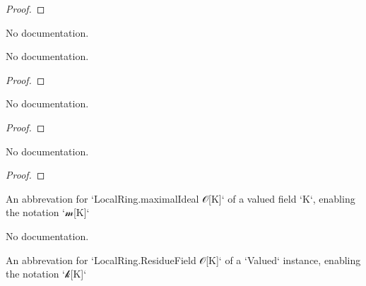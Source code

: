 \begin{proof}
    \leanok
\end{proof}

\begin{theorem}\label{Valued.integerAlgebraMap.monotone}
                No documentation.
    \end{theorem}

\begin{theorem}\label{Valued.integer_val_coe}
        \leanok
                No documentation.
    \end{theorem}

\begin{proof}
    \leanok
\end{proof}

\begin{theorem}\label{Valued.valuationSubring_val_coe}
        \leanok
                No documentation.
    \end{theorem}

\begin{proof}
    \leanok
\end{proof}

\begin{theorem}\label{Valued.integer_val_le_one}
        \leanok
                No documentation.
    \end{theorem}

\begin{proof}
    \leanok
\end{proof}

\begin{definition}\label{Valued.maximalIdeal}
        \leanok
                An abbrevation for `LocalRing.maximalIdeal 𝒪[K]` of a valued field `K`, enabling the notation `𝓂[K]`
    \end{definition}

\begin{theorem}\label{Valued.maximalIdeal_eq}
                No documentation.
    \end{theorem}

\begin{definition}\label{Valued.ResidueField}
        \leanok
                An abbrevation for `LocalRing.ResidueField 𝒪[K]` of a `Valued` instance, enabling the notation `𝓀[K]`
    \end{definition}

